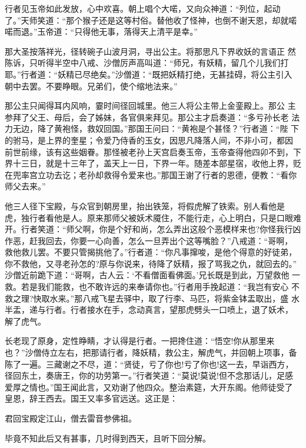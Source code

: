 行者见玉帝如此发放，心中欢喜。朝上唱个大喏，又向众神道：“列位，起动
了。”天师笑道：“那个猴子还是这等村俗。替他收了怪神，也倒不谢天恩，却就喏
喏而退。”玉帝道：“只得他无事，落得天上清平是幸。”

那大圣按落祥光，径转碗子山波月洞，寻出公主。将那思凡下界收妖的言语正
然陈诉，只听得半空中八戒、沙僧厉声高叫道：“师兄，有妖精，留几个儿我们打
耶。”行者道：“妖精已尽绝矣。”沙僧道：“既把妖精打绝，无甚挂碍，将公主引入
朝中去罢。不要睁眼。兄弟们，使个缩地法来。”

那公主只闻得耳内风响，霎时间径回城里。他三人将公主带上金銮殿上。那公
主参拜了父王、母后，会了姊妹，各官俱来拜见。那公主才启奏道：“多亏孙长老
法力无边，降了黄袍怪，救奴回国。”那国王问曰：“黄袍是个甚怪？”行者道：“陛
下的驸马，是上界的奎星；令爱乃侍香的玉女，因思凡降落人间，不非小可，都因
前世前缘，该有这些姻眷。那怪被老孙上天宫启奏玉帝，玉帝查得他四卯不到，下
界十三日，就是十三年了，盖天上一日，下界一年。随差本部星宿，收他上界，贬
在兜率宫立功去讫；老孙却救得令爱来也。”那国王谢了行者的恩德，便教：“看你
师父去来。”

他三人径下宝殿，与众官到朝房里，抬出铁笼，将假虎解了铁索。别人看他是
虎，独行者看他是人。原来那师父被妖术魇住，不能行走，心上明白，只是口眼难
开。行者笑道：“师父啊，你是个好和尚，怎么弄出这般个恶模样来也?你怪我行凶
作恶，赶我回去，你要一心向善，怎么一旦弄出个这等嘴脸？”八戒道：“哥啊，
救他救儿罢。不要只管揭挑他了。”行者道：“你凡事撺唆，是他个得意的好徒弟，
你不救他，又寻老孙怎的?原与你说来，待降了妖精，报了骂我之仇，就回去的。”
沙僧近前跪下道：“哥啊，古人云：‘不看僧面看佛面。’兄长既是到此，万望救他
一救。若是我们能救，也不敢许远的来奉请你也。”行者用手挽起道：“我岂有安心
不救之理?快取水来。”那八戒飞星去驿中，取了行李、马匹，将紫金钵盂取出，盛
水半盂，递与行者。行者接水在手，念动真言，望那虎劈头一口喷上，退了妖术，
解了虎气。

长老现了原身，定性睁睛，才认得是行者。一把搀住道：“悟空!你从那里来
也？”沙僧侍立左右，把那请行者，降妖精，救公主，解虎气，并回朝上项事，备
陈了一遍。三藏谢之不尽，道：“贤徒，亏了你也!亏了你也!这一去，早诣西方，
径回东土，奏唐王，你的功劳第一。”行者笑道：“莫说!莫说!但不念那话儿，足感
爱厚之情也。”国王闻此言，又劝谢了他四众。整治素筵，大开东阁。他师徒受了
皇恩，辞王西去。国王又率多官远送。这正是：

君回宝殿定江山，僧去雷音参佛祖。

毕竟不知此后又有甚事，几时得到西天，且听下回分解。